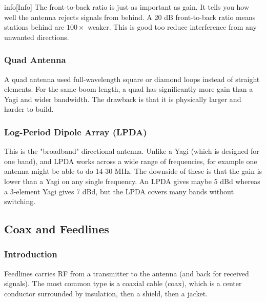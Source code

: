 \documentclass{article}
\begin{document}
\begin{callout}{info}[Info]
    The front-to-back ratio is just as important as gain. It tells you how well the antenna rejects signals from behind. A 20 dB front-to-back ratio means stations behind are $100\times$ weaker. This is good too reduce interference from any unwanted directions.
\end{callout}

\subsubsection{Quad Antenna}
A quad antenna used full-wavelength square or diamond loops instead of straight elements. For the same boom length, a quad has significantly more gain than a Yagi and wider bandwidth. The drawback is that it is physically larger and harder to build.

\subsubsection{Log-Period Dipole Array (LPDA)}
This is the "broadband" directional antenna. Unlike a Yagi (which is designed for one band), and LPDA works across a wide range of frequencies, for example one antenna might be able to do 14-30 MHz. The downside of these is that the gain is lower than a Yagi on any single frequency. An LPDA gives maybe 5 dBd whereas a 3-element Yagi gives 7 dBd, but the LPDA covers many bands without switching.

\subsection{Coax and Feedlines}
\subsubsection{Introduction}
Feedlines carries RF from a transmitter to the antenna (and back for received signals). The most common type is a coaxial cable (coax), which is a center conductor surrounded by insulation, then a shield, then a jacket.
\end{document}
